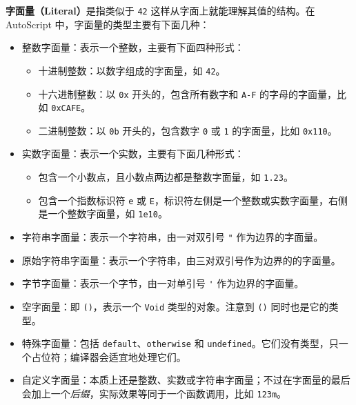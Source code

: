 \textbf{字面量（Literal）}是指类似于 \lstinline!42! 这样从字面上就能理解其值的结构。在 AutoScript 中，字面量的类型主要有下面几种：

\begin{itemize}
    \item 整数字面量：表示一个整数，主要有下面四种形式：
    \begin{itemize}
        \item 十进制整数：以数字组成的字面量，如 \lstinline!42!。
        
        \item 十六进制整数：以 \lstinline!0x! 开头的，包含所有数字和 \lstinline!A-F! 的字母的字面量，比如 \lstinline!0xCAFE!。

        \item 二进制整数：以 \lstinline!0b! 开头的，包含数字 \lstinline!0! 或 \lstinline!1! 的字面量，比如 \lstinline!0x110!。
    \end{itemize}

    \item 实数字面量：表示一个实数，主要有下面几种形式：
    \begin{itemize}
        \item 包含一个小数点，且小数点两边都是整数字面量，如 \lstinline!1.23!。

        \item 包含一个指数标识符 \lstinline!e! 或 \lstinline!E!，标识符左侧是一个整数或实数字面量，右侧是一个整数字面量，如 \lstinline!1e10!。
    \end{itemize}

    \item 字符串字面量：表示一个字符串，由一对双引号 \lstinline!"! 作为边界的字面量。

    \item 原始字符串字面量：表示一个字符串，由三对双引号作为边界的的字面量。

    \item 字节字面量：表示一个字节，由一对单引号 \lstinline!'! 作为边界的字面量。

    \item 空字面量：即 \lstinline!()!，表示一个 \lstinline!Void! 类型的对象。注意到 \lstinline!()! 同时也是它的类型。

    \item 特殊字面量：包括 \lstinline!default!、\lstinline!otherwise! 和 \lstinline!undefined!。它们没有类型，只一个占位符；编译器会适宜地处理它们。

    \item 自定义字面量：本质上还是整数、实数或字符串字面量；不过在字面量的最后会加上一个\emph{后缀}，实际效果等同于一个函数调用，比如 \lstinline!123m!。
\end{itemize}

